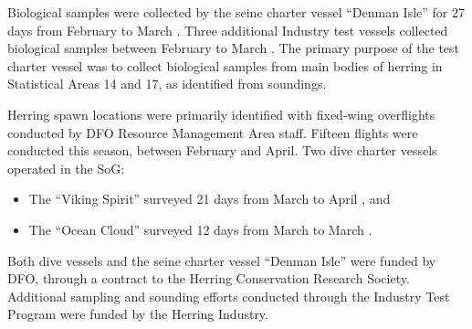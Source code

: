Biological samples were collected by the seine charter vessel ``Denman Isle'' for 27 days from February  to March .
Three additional Industry test vessels collected biological samples between February  to March .
The primary purpose of the test charter vessel was to collect biological samples from main bodies of herring in Statistical Areas 14 and 17, as identified from soundings.

Herring spawn locations were primarily identified with fixed-wing overflights conducted by DFO Resource Management Area staff.
Fifteen flights were conducted this season, between February and April.
Two dive charter vessels operated in the SoG:
\begin{itemize}
\item The ``Viking Spirit'' surveyed 21 days from March  to April , and
\item The ``Ocean Cloud'' surveyed 12 days from March  to March .
\end{itemize}
Both dive vessels and the seine charter vessel ``Denman Isle'' were funded by DFO, through a contract to the Herring Conservation Research Society.
Additional sampling and sounding efforts conducted through the Industry Test Program were funded by the Herring Industry.
